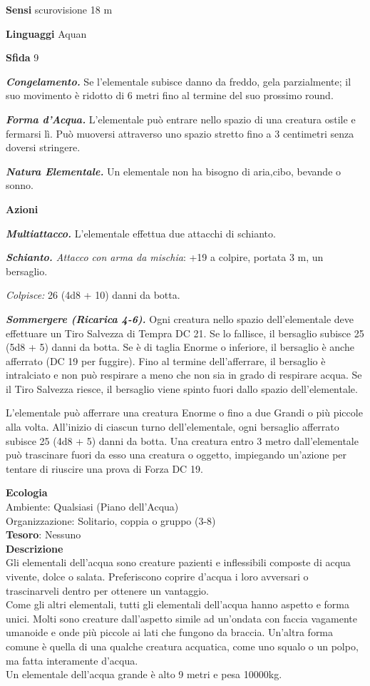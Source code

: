 \begin{multicols}{2}
	\textbf{Sensi} scurovisione 18 m

	\textbf{Linguaggi} Aquan

	\textbf{Sfida} 9

	\textit{\textbf{Congelamento.}} Se l'elementale subisce danno da freddo, gela parzialmente; il suo movimento è ridotto di 6 metri fino al termine del suo prossimo round.

	\textit{\textbf{Forma d'Acqua.}} L'elementale può entrare nello spazio di una creatura ostile e fermarsi lì. Può muoversi attraverso uno spazio stretto fino a 3 centimetri senza doversi stringere.

	\textit{\textbf{Natura Elementale.}} Un elementale non ha bisogno di aria,cibo, bevande o sonno.

	\textbf{Azioni}

	\textit{\textbf{Multiattacco.}} L'elementale effettua due attacchi di schianto.

	\textit{\textbf{Schianto.} Attacco con arma da mischia}: +19 a colpire, portata 3 m, un bersaglio.

	\textit{Colpisce:} 26 (4d8 + 10) danni da botta.

	\textit{\textbf{Sommergere (Ricarica 4-6).}} Ogni creatura nello spazio dell'elementale deve effettuare un Tiro Salvezza di Tempra DC 21. Se lo fallisce, il bersaglio subisce 25 (5d8 + 5) danni da botta. Se è di taglia Enorme o inferiore, il bersaglio è anche afferrato (DC 19 per fuggire). Fino al termine dell'afferrare, il bersaglio è intralciato e non può respirare a meno che non sia in grado di respirare acqua. Se il Tiro Salvezza riesce, il bersaglio viene spinto fuori dallo spazio dell'elementale.

	L'elementale può afferrare una creatura Enorme o fino a due Grandi o più piccole alla volta. All'inizio di ciascun turno dell'elementale, ogni bersaglio afferrato subisce 25 (4d8 + 5) danni da botta. Una creatura entro 3 metro dall'elementale può trascinare fuori da esso una creatura o oggetto, impiegando un'azione per tentare di riuscire una prova di Forza DC 19.

	\textbf{Ecologia}\\
	Ambiente: Qualsiasi (Piano dell'Acqua)\\
	Organizzazione: Solitario, coppia o gruppo (3-8)\\
	\textbf{Tesoro}: Nessuno\\
	\textbf{Descrizione}\\
	Gli elementali dell'acqua sono creature pazienti e inflessibili composte di acqua vivente, dolce o salata. Preferiscono coprire d'acqua i loro avversari o trascinarveli dentro per ottenere un vantaggio.\\
	Come gli altri elementali, tutti gli elementali dell'acqua hanno aspetto e forma unici. Molti sono creature dall'aspetto simile ad un'ondata con faccia vagamente umanoide e onde più piccole ai lati che fungono da braccia. Un'altra forma comune è quella di una qualche creatura acquatica, come uno squalo o un polpo, ma fatta interamente d'acqua.\\
	Un elementale dell'acqua grande è alto 9 metri e pesa 10000kg.


\end{multicols}
